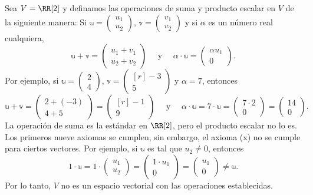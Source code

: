 \begin{examplebox}{}{}
    Sea $V = \RR[2]$ y definamos las operaciones de suma y producto escalar en $V$ de la siguiente manera: Si $\mathbb{u} = \begin{pmatrix}
        u_1 \\
        u_2
    \end{pmatrix}$, $\mathbb{v} = \begin{pmatrix}
        v_1 \\
        v_2
    \end{pmatrix}$ y si $\alpha$ es un número real cualquiera,
    $$\mathbb{u} + \mathbb{v} = \begin{pmatrix}
        u_1 + v_1 \\
        u_2 + v_2
    \end{pmatrix} \quad \text{ y } \quad \alpha \cdot \mathbb{u} = \begin{pmatrix}
        \alpha u_1 \\
        0
    \end{pmatrix}.$$
    Por ejemplo, si $\mathbb{u} = \begin{pmatrix}
        2 \\
        4
    \end{pmatrix}$, $\mathbb{v} = \begin{pmatrix*}[r]
        -3 \\
        5
    \end{pmatrix*}$ y $\alpha = 7$, entonces
    $$\mathbb{u} + \mathbb{v} = \begin{pmatrix}
        2 + (-3) \\
        4 + 5
    \end{pmatrix} = \begin{pmatrix*}[r]
        -1 \\
        9
    \end{pmatrix*} \quad \text{ y } \quad \alpha \cdot \mathbb{u} = 7 \cdot \mathbb{u} = \begin{pmatrix}
        7 \cdot 2 \\
        0
    \end{pmatrix} = \begin{pmatrix}
        14 \\ 
        0
    \end{pmatrix}.$$
    La operación de suma es la estándar en $\RR[2]$, pero el producto escalar no lo es. Los primeros nueve axiomas se cumplen, sin embargo, el axioma (x) no se cumple para ciertos vectores. Por ejemplo, si $\mathbb{u}$ es tal que $u_2 \neq 0$, entonces
    $$1 \cdot \mathbb{u} = 1 \cdot \begin{pmatrix}
        u_1 \\
        u_2
    \end{pmatrix} = \begin{pmatrix}
        1 \cdot u_1 \\
        0
    \end{pmatrix} = \begin{pmatrix}
        u_1 \\
        0
    \end{pmatrix} \neq \mathbb{u}.$$
    Por lo tanto, $V$ no es un espacio vectorial con las operaciones establecidas.
\end{examplebox}

